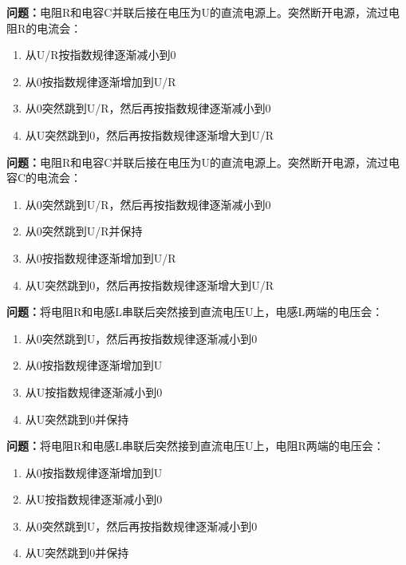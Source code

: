 \bigskip


\noindent\textbf{问题：}电阻R和电容C并联后接在电压为U的直流电源上。突然断开电源，流过电阻R的电流会：
\begin{enumerate}[label=\Alph*), leftmargin=3em]
\item 从U/R按指数规律逐渐减小到0
\item 从0按指数规律逐渐增加到U/R
\item 从0突然跳到U/R，然后再按指数规律逐渐减小到0
\item 从U突然跳到0，然后再按指数规律逐渐增大到U/R
\end{enumerate}

\bigskip


\noindent\textbf{问题：}电阻R和电容C并联后接在电压为U的直流电源上。突然断开电源，流过电容C的电流会：
\begin{enumerate}[label=\Alph*), leftmargin=3em]
\item 从0突然跳到U/R，然后再按指数规律逐渐减小到0
\item 从0突然跳到U/R并保持
\item 从0按指数规律逐渐增加到U/R
\item 从U突然跳到0，然后再按指数规律逐渐增大到U/R
\end{enumerate}

\bigskip


\noindent\textbf{问题：}将电阻R和电感L串联后突然接到直流电压U上，电感L两端的电压会：
\begin{enumerate}[label=\Alph*), leftmargin=3em]
\item 从0突然跳到U，然后再按指数规律逐渐减小到0
\item 从0按指数规律逐渐增加到U
\item 从U按指数规律逐渐减小到0
\item 从U突然跳到0并保持
\end{enumerate}

\bigskip


\noindent\textbf{问题：}将电阻R和电感L串联后突然接到直流电压U上，电阻R两端的电压会：
\begin{enumerate}[label=\Alph*), leftmargin=3em]
\item 从0按指数规律逐渐增加到U
\item 从U按指数规律逐渐减小到0
\item 从0突然跳到U，然后再按指数规律逐渐减小到0
\item 从U突然跳到0并保持
\end{enumerate}

\bigskip


